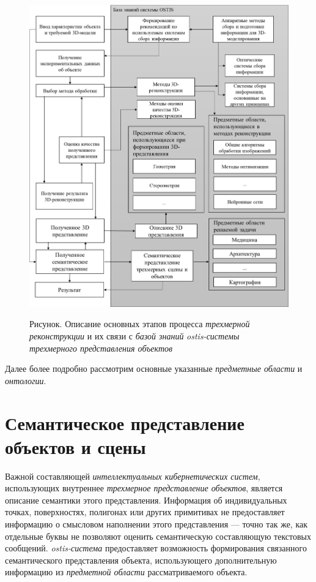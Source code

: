 \begin{figure}[H]
    \caption{Рисунок. Описание основных этапов процесса \textit{трехмерной реконструкции} и их связи с \textit{базой знаний} \textit{ostis-системы трехмерного представления объектов}}
    \includegraphics[scale=0.3]{author/part4/figures/schema3D.png}
    \label{fig:schema-3d-reconstruction}
\end{figure}

Далее более подробно рассмотрим основные указанные \textit{предметные области} и \textit{онтологии}.

\section{Семантическое представление объектов и сцены}
\label{sec_3d_models_semantics}

Важной составляющей \textit{интеллектуальных кибернетических систем}, использующих внутреннее \textit{трехмерное представление объектов}, является описание семантики этого представления. Информация об индивидуальных точках, поверхностях, полигонах или других примитивах не предоставляет информацию о смысловом наполнении этого представления --- точно так же, как отдельные буквы не позволяют оценить семантическую составляющую текстовых сообщений. \textit{ostis-система} предоставляет возможность формирования связанного семантического представления объекта, использующего дополнительную информацию из \textit{предметной области} рассматриваемого объекта.


